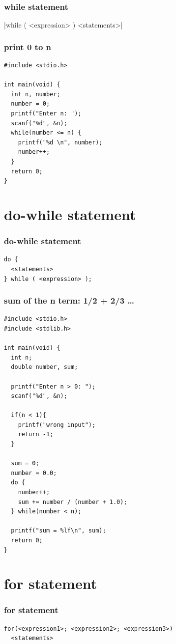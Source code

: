 \documentclass{../c-lecture}
\begin{document}
\begin{frame}
  \frametitle{while statement}
  |while ( <expression> ) <statements>|
\end{frame}

\begin{frame}[fragile]
  \frametitle{print 0 to n}
  \begin{verbatim}
#include <stdio.h>

int main(void) {
  int n, number;
  number = 0;
  printf("Enter n: ");
  scanf("%d", &n);
  while(number <= n) {
    printf("%d \n", number);
    number++;
  }
  return 0;
}
  \end{verbatim}
\end{frame}

\section{do-while statement}

\begin{frame}[fragile]
  \frametitle{do-while statement}
  \begin{verbatim}
do {
  <statements>
} while ( <expression> );
  \end{verbatim}
\end{frame}

\begin{frame}[fragile]
  \frametitle{sum of the n term: 1/2 + 2/3 \ldots}
  \scriptsize
  \begin{verbatim}
#include <stdio.h>
#include <stdlib.h>

int main(void) {
  int n;
  double number, sum;

  printf("Enter n > 0: ");
  scanf("%d", &n);

  if(n < 1){
    printf("wrong input");
    return -1;
  }

  sum = 0;
  number = 0.0;
  do {
    number++;
    sum += number / (number + 1.0);
  } while(number < n);

  printf("sum = %lf\n", sum);
  return 0;
}
  \end{verbatim}
\end{frame}

\section{for statement}

\begin{frame}[fragile]
  \frametitle{for statement}
  \begin{verbatim}
for(<expression1>; <expression2>; <expression3>)
  <statements>
  \end{verbatim}
\end{frame}
\end{document}
